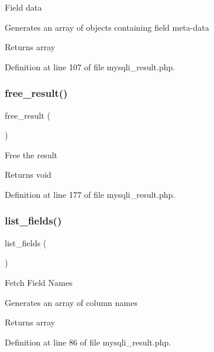 Field data

Generates an array of objects containing field meta-\/data

\begin{DoxyReturn}{Returns}
array 
\end{DoxyReturn}


Definition at line 107 of file mysqli\+\_\+result.\+php.

\mbox{\label{class_c_i___d_b__mysqli__result_aad2d98d6beb3d6095405356c6107b473}} 
\subsubsection{\texorpdfstring{free\_result()}{free\_result()}}
{\footnotesize\ttfamily free\+\_\+result (\begin{DoxyParamCaption}{ }\end{DoxyParamCaption})}

Free the result

\begin{DoxyReturn}{Returns}
void 
\end{DoxyReturn}


Definition at line 177 of file mysqli\+\_\+result.\+php.

\mbox{\label{class_c_i___d_b__mysqli__result_a50b54eb4ea7cfd039740f532988ea776}} 
\subsubsection{\texorpdfstring{list\_fields()}{list\_fields()}}
{\footnotesize\ttfamily list\+\_\+fields (\begin{DoxyParamCaption}{ }\end{DoxyParamCaption})}

Fetch Field Names

Generates an array of column names

\begin{DoxyReturn}{Returns}
array 
\end{DoxyReturn}


Definition at line 86 of file mysqli\+\_\+result.\+php.

